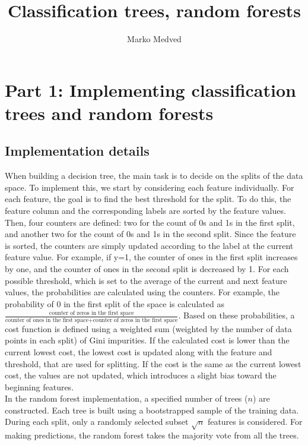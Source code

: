 \documentclass[9pt]{IEEEtran}
\title{\vspace{0ex}
Classification trees, random forests}
\author{Marko Medved\vspace{-4.0ex}}
\begin{document}
\maketitle

\section{Part 1: Implementing classification trees and random forests}
\subsection{Implementation details}

When building a decision tree, the main task is to decide on the splits of the data space. To implement
 this, we start by considering each feature individually. For each feature, the goal is to find the best 
 threshold for the split. To do this, the feature column and the corresponding labels are sorted by the 
 feature values. Then, four counters are defined: two for the count of 0s and 1s in the first split, and
  another two for the count of 0s and 1s in the second split. Since the feature is sorted, the counters are
   simply updated according to the label at the current feature value. For example, if 
y=1, the counter of ones in the first split increases by one, and the counter of ones in the second split is decreased by 1. For each possible threshold, which is set to the average of the current and next feature values, the probabilities are calculated using the counters. For example, the probability of 0 in the first split of the space is calculated as 
$\frac{\text{counter of zeros in the first space}}{\text{counter of ones in the first space}
 + \text{counter of zeros in the first space}}$. Based on these probabilities, a cost function is
  defined using a weighted sum (weighted by the number of data points in each split) of Gini impurities.
   If the calculated cost is lower than the current lowest cost, the lowest cost is updated along with the 
   feature and threshold, that are used for splitting. If the cost is the same as the current lowest cost, the values are not updated, 
   which introduces a slight bias toward the beginning features. 
\\

In the random forest implementation, a specified number of trees ($n$) 
are constructed. Each tree is built using a bootstrapped sample of the training data.
 During each split, only a randomly selected subset  $\sqrt{n}$ features is considered. For making
  predictions, the random forest takes the majority vote from all the trees.
\end{document}
